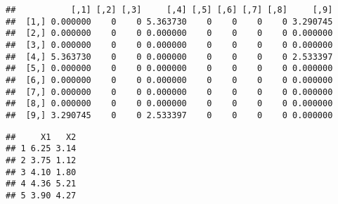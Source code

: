 \documentclass[12pt]{report}\usepackage[]{graphicx}\usepackage[dvipsnames]{xcolor}
\makeatletter
\newenvironment{kframe}{%
 \def\at@end@of@kframe{}%
 \ifinner\ifhmode%
  \def\at@end@of@kframe{\end{minipage}}%
  \begin{minipage}{\columnwidth}%
 \fi\fi%
 \def\FrameCommand##1{\hskip\@totalleftmargin \hskip-\fboxsep
 \colorbox{shadecolor}{##1}\hskip-\fboxsep
     \hskip-\linewidth \hskip-\@totalleftmargin \hskip\columnwidth}%
 \MakeFramed {\advance\hsize-\width
   \@totalleftmargin\z@ \linewidth\hsize
   \@setminipage}}%
 {\par\unskip\endMakeFramed%
 \at@end@of@kframe}
\newenvironment{knitrout}{}{} %
\makeatother
\begin{document}
\begin{knitrout}
\begin{kframe}
{\ttfamily\noindent\itshape\color{messagecolor}{\#\# \\\#\# \ Matrix Distance (distance type = EUC, approach type = MIN):}}\begin{verbatim}
##           [,1] [,2] [,3]     [,4] [,5] [,6] [,7] [,8]     [,9]
##  [1,] 0.000000    0    0 5.363730    0    0    0    0 3.290745
##  [2,] 0.000000    0    0 0.000000    0    0    0    0 0.000000
##  [3,] 0.000000    0    0 0.000000    0    0    0    0 0.000000
##  [4,] 5.363730    0    0 0.000000    0    0    0    0 2.533397
##  [5,] 0.000000    0    0 0.000000    0    0    0    0 0.000000
##  [6,] 0.000000    0    0 0.000000    0    0    0    0 0.000000
##  [7,] 0.000000    0    0 0.000000    0    0    0    0 0.000000
##  [8,] 0.000000    0    0 0.000000    0    0    0    0 0.000000
##  [9,] 3.290745    0    0 2.533397    0    0    0    0 0.000000
\end{verbatim}


{\ttfamily\noindent\itshape\color{messagecolor}{\#\# \\\#\# \ The minimum distance is: 2.53339692902632}}

{\ttfamily\noindent\itshape\color{messagecolor}{\#\# \\\#\# \ The closest clusters are: 4, 9}}

{\ttfamily\noindent\itshape\color{messagecolor}{\#\# \\\#\# \ The grouped clusters are added to the solution.}}

{\ttfamily\noindent\itshape\color{messagecolor}{\#\# \\\#\# \ Grouping clusters 4 and cluster 9, it is created a new cluster:}}\begin{verbatim}
##     X1   X2
## 1 6.25 3.14
## 2 3.75 1.12
## 3 4.10 1.80
## 4 4.36 5.21
## 5 3.90 4.27
\end{verbatim}


{\ttfamily\noindent\itshape\color{messagecolor}{\#\# \\\#\# \ The new cluster is added to the solution.}}

{\ttfamily\noindent\itshape\color{messagecolor}{\#\# \\\#\# \_\_\_\_\_\_\_\_\_\_\_\_\_\_\_\_\_\_\_\_\_\_\_\_\_\_\_\_\_\_\_\_\_\_\_\_\_\_\_\_\_\_\_\_\_\_\_\_\_\_\_\_\_\_\_\_\_\_\_\_\_\_\_\_\_\_\_\_\_\_\_\_\_\_\_\_\_\_\_\_\_\_\_\_\_\_\_\_\_\_\_\_\_}}

{\ttfamily\noindent\itshape\color{messagecolor}{\#\# STEP => 5}}


\end{kframe}
\end{knitrout}
\end{document}
